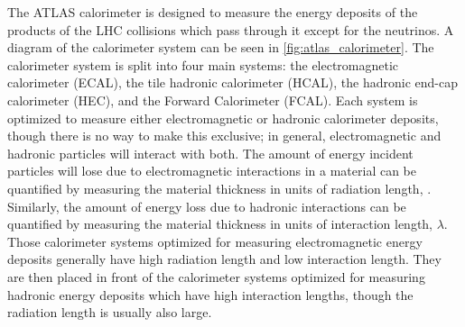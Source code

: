 The ATLAS calorimeter is designed to measure the energy
deposits of the products of the LHC collisions which pass through
it except for the neutrinos.  A diagram of the 
calorimeter system can be seen in \fig\ref{fig:atlas_calorimeter}.
The calorimeter system is split into four main systems:
the electromagnetic calorimeter (ECAL), the 
tile hadronic calorimeter (HCAL), the hadronic 
end-cap calorimeter (HEC), 
and the Forward Calorimeter (FCAL).
Each system is optimized to measure either electromagnetic
or hadronic calorimeter deposits, though there is no
way to make this exclusive; in general,
electromagnetic and hadronic particles will interact with both.
The amount of energy incident particles will lose due to electromagnetic
interactions in a material can be quantified by measuring the material thickness
in units of radiation length, \xzero. Similarly, the amount of energy loss
due to hadronic interactions can be quantified by measuring the material
thickness in units of interaction length, $\lambda$.
Those calorimeter systems optimized for measuring electromagnetic 
energy deposits generally have high radiation length and low interaction
length. They are then placed in front of the calorimeter systems
optimized for measuring hadronic energy deposits which have high
interaction lengths, though
the radiation length is usually also large.


